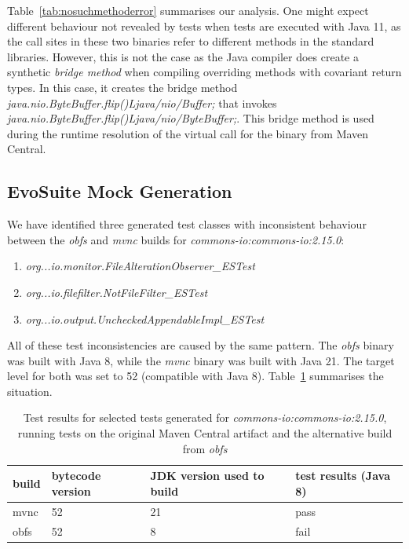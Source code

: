 \documentclass[conference]{IEEEtran}
\newcommand{\tim}[1]{\textbf{\textcolor{violet}{[ \ding{46}Tim: #1]}}}
\renewcommand{\tim}[1]{}
\begin{document}
Table~\ref{tab:nosuchmethoderror} summarises our analysis.\tim{Add rows for netty-codec-http} One might expect different behaviour not revealed by tests when tests are executed with Java 11, as the call sites in these two binaries refer to different methods in the standard libraries. However, this is not the case as the Java compiler does create a synthetic \textit{bridge method} when compiling overriding methods with covariant return types. In this case, it creates the bridge method \textit{java.nio.ByteBuffer.flip()Ljava/nio/Buffer;}  that invokes \textit{java.nio.ByteBuffer.flip()Ljava/nio/ByteBuffer;}. This bridge method is used during the  runtime resolution of the virtual call for the binary from Maven Central.  


\subsection{EvoSuite Mock Generation}


We have identified three generated test classes with inconsistent behaviour between the \textit{obfs} and \textit{mvnc} builds for \textit{commons-io:commons-io:2.15.0}: 
\begin{enumerate}
	\item  \textit{org...io.monitor.FileAlterationObserver\_ESTest}
    \item \textit{org...io.filefilter.NotFileFilter\_ESTest}
    \item  \textit{org...io.output.UncheckedAppendableImpl\_ESTest}
\end{enumerate}

All of these test inconsistencies are caused by the same pattern.  The \textit{obfs} binary was built  with Java 8, while the \textit{mvnc} binary was built with Java 21. The target level for both was set to 52 (compatible with Java 8). Table~\ref{tab:stackoverflow} summarises the situation.


\begin{table}[h]
	\begin{tabular}{|p{2.0cm}p{1.2cm}p{1.5cm}p{1.3cm}|}
		\hline
		build         & bytecode version & JDK version used to build & test results (Java 8)                                            \\ \hline 
		mvnc & 52       & 21                        & pass                                                                                        \\
		obfs         & 52               & 8                        & fail              \\ \hline
	\end{tabular}
	\caption{Test results for selected tests generated for  \textit{commons-io:commons-io:2.15.0}, running tests on the original Maven Central artifact and the alternative build from \textit{obfs}}
	\label{tab:stackoverflow}
\end{table}
\end{document}
